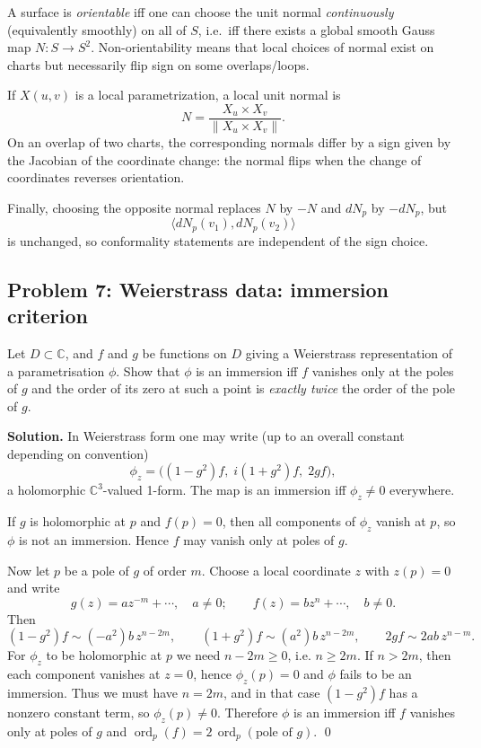\documentclass[12pt,a4paper]{article}
\DeclareMathOperator{\ord}{ord}
\theoremstyle{plain}
\theoremstyle{definition}      %
\begin{document}
	A surface is \emph{orientable} iff one can choose the unit normal \emph{continuously} (equivalently smoothly) on all of $S$,
	i.e.\ iff there exists a global smooth Gauss map $N:S\to S^2$.
	Non-orientability means that local choices of normal exist on charts but necessarily flip sign on some overlaps/loops.
	
	If $X(u,v)$ is a local parametrization, a local unit normal is
	\[
	N=\frac{X_u\times X_v}{\|X_u\times X_v\|}.
	\]
	On an overlap of two charts, the corresponding normals differ by a sign given by the Jacobian of the coordinate change:
	the normal flips when the change of coordinates reverses orientation.
	
	Finally, choosing the opposite normal replaces $N$ by $-N$ and $dN_p$ by $-dN_p$, but
	\[
	\langle dN_p(v_1),dN_p(v_2)\rangle
	\]
	is unchanged, so conformality statements are independent of the sign choice.
	
	
	
\subsection*{Problem 7: Weierstrass data: immersion criterion}
	Let $D\subset\mathbb C$, and $f$ and $g$ be functions on $D$ giving a Weierstrass representation of a
	parametrisation $\phi$. Show that $\phi$ is an immersion iff $f$ vanishes only at the poles of $g$ and the
	order of its zero at such a point is \emph{exactly twice} the order of the pole of $g$.
	
	\medskip
	\textbf{Solution.}
	In Weierstrass form one may write (up to an overall constant depending on convention)
	\[
	\phi_z = \big((1-g^2)f,\; i(1+g^2)f,\; 2gf\big),
	\]
	a holomorphic $\mathbb C^3$-valued 1-form. The map is an immersion iff $\phi_z\neq 0$ everywhere.
	
	If $g$ is holomorphic at $p$ and $f(p)=0$, then all components of $\phi_z$ vanish at $p$, so $\phi$ is not an
	immersion. Hence $f$ may vanish only at poles of $g$.
	
	Now let $p$ be a pole of $g$ of order $m$. Choose a local coordinate $z$ with $z(p)=0$ and write
	\[
	g(z)=a z^{-m}+\cdots,\quad a\neq 0;\qquad f(z)=b z^{n}+\cdots,\quad b\neq 0.
	\]
	Then
	\[
	(1-g^2)f \sim (-a^2)b\,z^{n-2m},\qquad (1+g^2)f\sim (a^2)b\,z^{n-2m},\qquad 2gf\sim 2ab\,z^{n-m}.
	\]
	For $\phi_z$ to be holomorphic at $p$ we need $n-2m\ge 0$, i.e. $n\ge 2m$.
	If $n>2m$, then each component vanishes at $z=0$, hence $\phi_z(p)=0$ and $\phi$ fails to be an immersion.
	Thus we must have $n=2m$, and in that case $(1-g^2)f$ has a nonzero constant term, so $\phi_z(p)\neq 0$.
	Therefore $\phi$ is an immersion iff $f$ vanishes only at poles of $g$ and $\ord_p(f)=2\,\ord_p(\text{pole of }g)$.
	\qed
	
\end{document}
